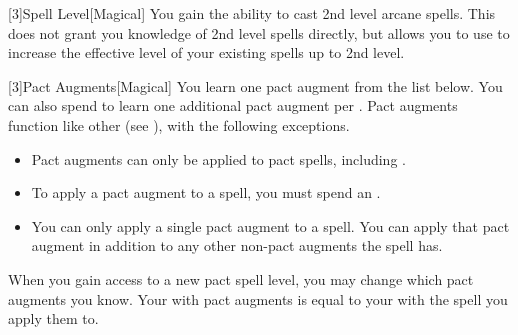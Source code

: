         [3]{Spell Level}[Magical] You gain the ability to cast 2nd level arcane spells.
        This does not grant you knowledge of 2nd level spells directly, but allows you to use  to increase the effective level of your existing spells up to 2nd level.

        [3]{Pact Augments}[Magical] You learn one pact augment from the list below.
        You can also spend  to learn one additional pact augment per .
        Pact augments function like other  (see ), with the following exceptions.
        \begin{itemize}
            \item Pact augments can only be applied to pact spells, including .
            \item To apply a pact augment to a spell, you must spend an .
            \item You can only apply a single pact augment to a spell.
                You can apply that pact augment in addition to any other non-pact augments the spell has.
        \end{itemize}
        When you gain access to a new pact spell level, you may change which pact augments you know.
        Your  with pact augments is equal to your  with the spell you apply them to.
